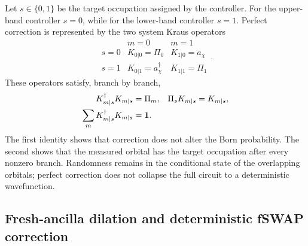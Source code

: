 Let \(s\in\{0,1\}\) be the target occupation assigned by the controller.
For the upper-band controller \(s=0\), while for the lower-band controller
\(s=1\).  Perfect correction is represented by the two system Kraus
operators
\begin{equation}
    \begin{array}{c|cc}
      &m=0&m=1\\ \hline
      s=0&K_{0|0}=\Pi_0&K_{1|0}=a_\chi\\[1mm]
      s=1&K_{0|1}=a_\chi^\dagger&K_{1|1}=\Pi_1
    \end{array}.
    \label{eq:app-perfect-correction-kraus-table}
\end{equation}
These operators satisfy, branch by branch,
\begin{align}
    K_{m|s}^\dagger K_{m|s}&=\Pi_m,
    &\Pi_sK_{m|s}&=K_{m|s},\nonumber\\
    \sum_mK_{m|s}^\dagger K_{m|s}&=\mathbf{1}.
    \label{eq:app-perfect-correction-checks}
\end{align}
The first identity shows that correction does not alter the Born probability.
The second shows that the measured orbital has the target occupation after
every nonzero branch.  Randomness remains in the conditional state of the
overlapping orbitals; perfect correction does not collapse the full circuit
to a deterministic wavefunction.

\subsection{Fresh-ancilla dilation and deterministic fSWAP correction}

